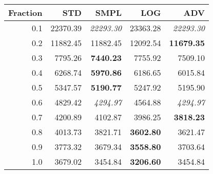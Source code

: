 \documentclass{standalone}
\begin{document}
\begin{tabular}{r|rrrr}
      \toprule
      Fraction & STD & SMPL & LOG & ADV\\
      \midrule
      0.1 & 22370.39 & \emph{22293.30} & 23363.28 & \emph{22293.30}\\
  0.2 & 11882.45 & 11882.45 & 12092.54 & \textbf{11679.35}\\
  0.3 & 7795.26 & \textbf{7440.23} & 7755.92 & 7509.10\\
  0.4 & 6268.74 & \textbf{5970.86} & 6186.65 & 6015.84\\
  0.5 & 5347.57 & \textbf{5190.77} & 5247.92 & 5195.90\\
  0.6 & 4829.42 & \emph{4294.97} & 4564.88 & \emph{4294.97}\\
  0.7 & 4200.89 & 4102.87 & 3986.25 & \textbf{3818.23}\\
  0.8 & 4013.73 & 3821.71 & \textbf{3602.80} & 3621.47\\
  0.9 & 3773.32 & 3679.34 & \textbf{3558.80} & 3703.64\\
  1.0 & 3679.02 & 3454.84 & \textbf{3206.60} & 3454.84\\
  \bottomrule
\end{tabular}
\end{document}
